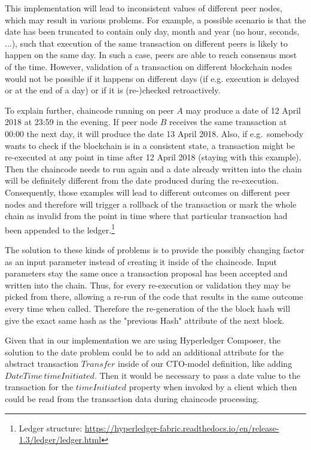 This implementation will lead to inconsistent values of different peer nodes, which may result in various problems. For example, a possible scenario is that the date has been truncated to contain only day, month and year (no hour, seconds, ...), such that execution of the same transaction on different peers is likely to happen on the same day. In such a case, peers are able to reach consensus most of the time. However, validation of a transaction on different blockchain nodes would not be possible if it happens on different days (if e.g. execution is delayed or at the end of a day) or if it is (re-)checked retroactively.

To explain further, chaincode running on peer $A$ may produce a date of 12 April 2018 at 23:59 in the evening. If peer node $B$ receives the same transaction at 00:00 the next day, it will produce the date 13 April 2018. Also, if e.g.\ somebody wants to check if the blockchain is in a consistent state, a transaction might be re-executed at any point in time after 12 April 2018 (staying with this example). Then the chaincode needs to run again and a date already written into the chain will be definitely different from the date produced during the re-execution. Consequently, those examples will lead to different outcomes on different peer nodes and therefore will trigger a rollback of the transaction or mark the whole chain as invalid from the point in time where that particular transaction had been appended to the ledger.\footnote{Ledger structure: \url{https://hyperledger-fabric.readthedocs.io/en/release-1.3/ledger/ledger.html}}

The solution to these kinds of problems is to provide the possibly changing factor as an input parameter instead of creating it inside of the chaincode. Input parameters stay the same once a transaction proposal has been accepted and written into the chain. Thus, for every re-execution or validation they may be picked from there, allowing a re-run of the code that results in the same outcome every time when called. Therefore the re-generation of the the block hash will give the exact same hash as the "previous Hash" attribute of the next block.

Given that in our implementation we are using Hyperledger Composer, the solution to the date problem could be to add an additional attribute for the abstract transaction $Transfer$ inside of our CTO-model definition, like adding $DateTime\ timeInitiated$. Then it would be necessary to pass a date value to the transaction for the $timeInitiated$ property when invoked by a client which then could be read from the transaction data during chaincode processing.

